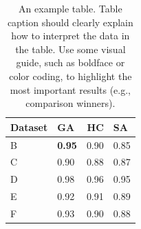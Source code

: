 \begin{table}
\centering\footnotesize\sf
\begin{tabular}{llrl}
\toprule
Dataset & GA & HC & SA \\
\midrule
B & \textbf{0.95} & 0.90 & 0.85 \\
C & 0.90 & 0.88 & 0.87 \\
D & 0.98 & 0.96 & 0.95 \\
E & 0.92 & 0.91 & 0.89 \\
F & 0.93 & 0.90 & 0.88 \\
\bottomrule
\end{tabular}
\caption{An example table.  Table caption should clearly explain how to interpret the data in the table. Use some visual guide, such as boldface or color coding, to highlight the most important results (e.g., comparison winners).}
\label{tab:results}
\end{table}
